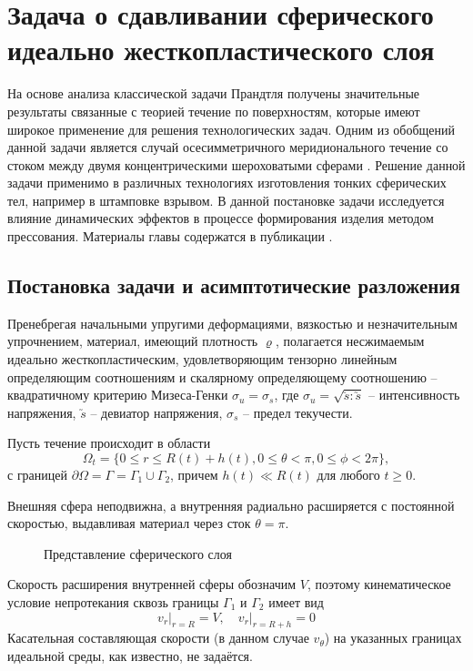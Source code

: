 \chapter{Задача о сдавливании сферического идеально жесткопластического слоя}\label{ch:ch3}
На основе анализа классической задачи Прандтля \autocite{Prandtl:1948} получены значительные результаты связанные с теорией течение по поверхностям, которые имеют широкое применение для решения технологических задач. Одним из обобщений данной задачи является случай осесимметричного меридионального течение со стоком между двумя концентрическими шероховатыми сферами \autocite{Georgievsky:2011}. 
Решение данной задачи применимо в различных технологиях изготовления тонких сферических тел, например в штамповке взрывом.
В данной постановке задачи исследуется влияние динамических эффектов в процессе формирования изделия методом прессования. Материалы главы содержатся в публикации \autocite{Shabaykin:2020a}.

\section{Постановка задачи и асимптотические разложения}\label{sec:ch3/sec1}

Пренебрегая начальными упругими деформациями, вязкостью и незначительным упрочнением, материал, имеющий плотность $\varrho$, полагается несжимаемым идеально жесткопластическим, удовлетворяющим тензорно линейным определяющим соотношениям и скалярному определяющему соотношению -- квадратичному критерию Мизеса-Генки $\sigma_{u} = \sigma_{s}$, где $\sigma_{u} = \sqrt{\utilde{s} : \utilde{s}}$ -- интенсивность напряжения, $\utilde{s}$ -- девиатор напряжения, $\sigma_{s}$ -- предел текучести.

Пусть течение происходит в области
\begin{equation}
  \Omega_{t} = \{0 \le r \le R(t)+ h(t), 0 \le \theta < \pi, 0 \le \phi < 2\pi\},
\end{equation}
с границей $\partial\Omega = \Gamma = \Gamma_{1} \cup \Gamma_{2}$, причем $h(t) \ll R(t)$ для любого $t \ge 0$.

Внешняя сфера неподвижна, а внутренняя радиально расширяется с постоянной скоростью, выдавливая материал через сток $\theta=\pi$.

\begin{figure}[ht]
    \caption{Представление сферического слоя}
    \label{fig:ch3/layer/circle}
  \end{figure}
  Скорость расширения внутренней сферы обозначим $V$, поэтому кинематическое условие непротекания сквозь границы $\Gamma_{1}$ и $\Gamma_{2}$ имеет вид
  \begin{equation}
  \label{eq:ch3/sec1/boundary/kinematic}
  v_{r}\lvert_{r=R} = V, \quad v_{r}\lvert_{r=R + h} = 0
\end{equation}
Касательная составляющая скорости (в данном случае $v_{\theta}$) на указанных границах идеальной среды, как известно, не задаётся.

